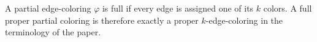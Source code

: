 \begin{definition}
A partial edge-coloring $\varphi$ is full if every edge is assigned one of
its $k$ colors.  A full proper partial coloring is therefore exactly a
proper $k$-edge-coloring in the terminology of the paper.
\end{definition}
